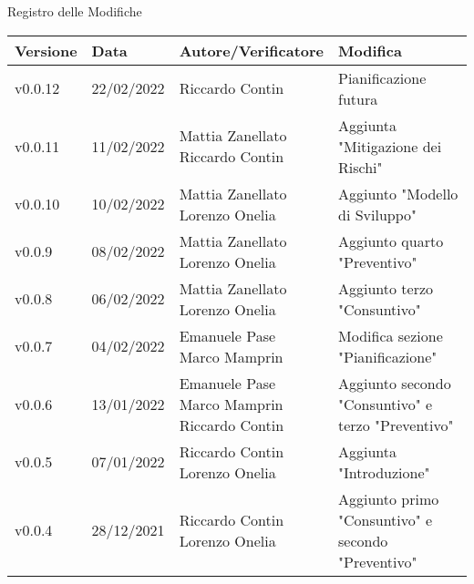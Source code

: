 \begin{center}
  \huge{Registro delle Modifiche}
\end{center}
\newcommand{\aCapo}[1]{%
  \begin{tabular}{@{}c@{}}\strut#1\strut\end{tabular}%
}
\begin{center}
  \begin{longtable}{|p{2cm}|p{2.1cm}|p{4.2cm}|p{4.8cm}|}
    \hline
    \textbf{Versione} & \textbf{Data} & \textbf{Autore/Verificatore} & \textbf{Modifica}     \\ \hline
    v0.0.12           & 22/02/2022    & \aCapo{Riccardo Contin\\}             & Pianificazione futura \\ \hline
    v0.0.11           & 11/02/2022    & \aCapo{Mattia Zanellato\\Riccardo Contin}             & Aggiunta "Mitigazione dei Rischi" \\ \hline
    v0.0.10           & 10/02/2022    & \aCapo{Mattia Zanellato\\Lorenzo Onelia}              & Aggiunto "Modello di Sviluppo" \\ \hline
    v0.0.9            & 08/02/2022    & \aCapo{Mattia Zanellato\\Lorenzo Onelia}              & Aggiunto quarto "Preventivo" \\ \hline
    v0.0.8            & 06/02/2022    & \aCapo{Mattia Zanellato\\Lorenzo Onelia}              & Aggiunto terzo "Consuntivo" \\ \hline
    v0.0.7            & 04/02/2022    & \aCapo{Emanuele Pase\\Marco Mamprin}                  & Modifica sezione "Pianificazione" \\ \hline
    v0.0.6            & 13/01/2022    & \aCapo{Emanuele Pase\\Marco Mamprin\\Riccardo Contin} & Aggiunto secondo "Consuntivo" e terzo "Preventivo" \\ \hline
    v0.0.5            & 07/01/2022    & \aCapo{Riccardo Contin\\Lorenzo Onelia}               & Aggiunta "Introduzione" \\ \hline
    v0.0.4            & 28/12/2021    & \aCapo{Riccardo Contin\\Lorenzo Onelia}               & Aggiunto primo "Consuntivo" e secondo "Preventivo" \\ \hline

\end{longtable}
\end{center}
